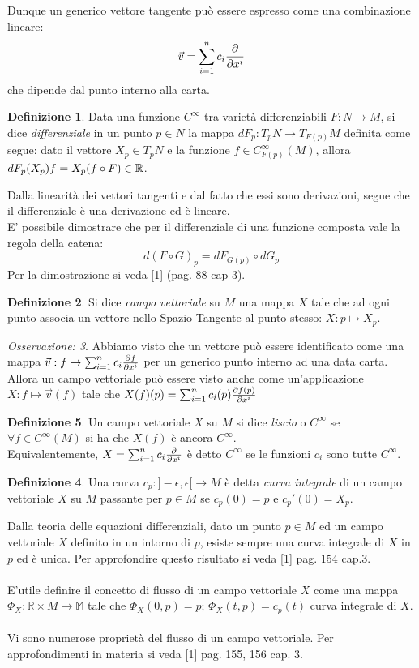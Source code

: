 \documentclass[12pt,a4paper]{report}
\theoremstyle{definition}
\newtheorem{Def}{Definizione}[chapter]
\theoremstyle{definition}
\theoremstyle{definition}
\theoremstyle{remark}
\newtheorem{Obs}[Def]{Osservazione:}
\begin{document}
Dunque un generico vettore tangente può essere espresso come una combinazione lineare: $$\vec{v}=\sum_{i=1}^{n}c_i{\partial\over \partial x^i}$$ che dipende dal punto interno alla carta.
\begin{Def}
	Data una funzione $C^\infty$ tra varietà differenziabili $F:N\rightarrow M$, si dice \textit{differenziale} in un punto $p\in N$ la mappa $dF_p:T_pN\rightarrow T_{F(p)}M$ definita come segue: dato il vettore $X_p\in T_pN$ e la funzione $f\in C_{F(p)}^\infty(M)$, allora $dF_p(X_p)f=\\X_p(f\circ F)\in\mathbb{R}$.\\
\end{Def}
Dalla linearità dei vettori tangenti e dal fatto che essi sono derivazioni, segue che il differenziale è una derivazione ed è lineare. \\
E' possibile dimostrare che per il differenziale di una funzione composta vale la regola della catena: $$d(F\circ G)_p=dF_{G(p)}\circ dG_p$$ Per la dimostrazione si veda [1] (pag. 88 cap 3).
\begin{Def}
	Si dice \textit{campo vettoriale} su $M$ una mappa $X$ tale che ad ogni punto associa un vettore nello Spazio Tangente al punto stesso: $X:p\mapsto X_p$. 
\end{Def}
\begin{Obs}
	Abbiamo visto che un vettore può essere identificato come una mappa $\vec{v}:f\mapsto\sum_{i=1}^{n}c_i{\partial f\over \partial x^i}$ per un generico punto interno ad una data carta. Allora un campo vettoriale può essere visto anche come un'applicazione $X:f\mapsto\vec{v}(f)$ tale che $X(f)(p)=\sum_{i=1}^{n}c_i(p){\partial f(p)\over \partial x^i}$
\end{Obs}
\begin{Def}
	Un campo vettoriale $X$ su $M$ si dice \textit{liscio} o $C^\infty$ se $\forall f\in C^\infty(M)$ si ha che $X(f)$ è ancora $C^\infty$.
\\
Equivalentemente, $X=\sum_{i=1}^{n}c_i{\partial\over \partial x^i}$ è detto $C^\infty$ se le funzioni $c_i$ sono tutte $C^\infty$.
\begin{Def}
	Una curva $c_p:]-\epsilon,\epsilon[\rightarrow M$ è detta \textit{curva integrale} di un campo vettoriale $X$ su $M$ passante per $p\in M$ se $c_p(0)=p$ e $c_p'(0)=X_p$.
\end{Def}
Dalla teoria delle equazioni differenziali, dato un punto $p\in M$ ed un campo vettoriale $X$ definito in un intorno di $p$, esiste sempre una curva integrale di $X$ in $p$ ed è unica. Per approfondire questo risultato si veda [1] pag. 154 cap.3.\\
\\
E'utile definire il concetto di flusso di un campo vettoriale $X$ come una mappa $\Phi_X:\mathbb{R}\times M\rightarrow\mathbb{M}$ tale che $\Phi_X(0,p)=p$; $\Phi_X(t,p)=c_p(t)$ curva integrale di $X$.\\
\\
Vi sono numerose proprietà del flusso di un campo vettoriale. Per approfondimenti in materia si veda [1] pag. 155, 156 cap. 3.
\end{Def}
\end{document}
